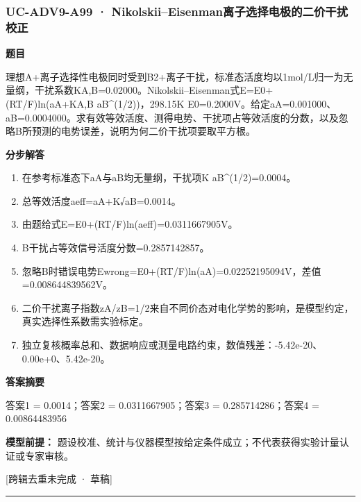 \documentclass[UTF8,11pt,a4paper]{ctexart}
\begin{document}
\subsubsection*{UC-ADV9-A99 · Nikolskii–Eisenman离子选择电极的二价干扰校正}
\noindent\textbf{题目}\par
理想A+离子选择性电极同时受到B2+离子干扰，标准态活度均以1mol/L归一为无量纲，干扰系数KA,B=0.02000。Nikolskii–Eisenman式E=E0+(RT/F)ln(aA+KA,B aB\textasciicircum{}(1/2))，298.15K E0=0.2000V。给定aA=0.001000、aB=0.0004000。求有效等效活度、测得电势、干扰项占等效活度的分数，以及忽略B所预测的电势误差，说明为何二价干扰项要取平方根。\par
\medskip\noindent\textbf{分步解答}
\begin{enumerate}
\item 在参考标准态下aA与aB均无量纲，干扰项K aB\textasciicircum{}(1/2)=0.0004。
\item 总等效活度aeff=aA+K√aB=0.0014。
\item 由题给式E=E0+(RT/F)ln(aeff)=0.0311667905V。
\item B干扰占等效信号活度分数=0.2857142857。
\item 忽略B时错误电势Ewrong=E0+(RT/F)ln(aA)=0.02252195094V，差值=0.008644839562V。
\item 二价干扰离子指数zA/zB=1/2来自不同价态对电化学势的影响，是模型约定，真实选择性系数需实验标定。
\item 独立复核概率总和、数据响应或测量电路约束，数值残差：-5.42e-20、0.00e+0、5.42e-20。
\end{enumerate}
\noindent\textbf{答案摘要}\par
答案1 = 0.0014；答案2 = 0.0311667905；答案3 = 0.285714286；答案4 = 0.00864483956\par
\noindent\textbf{模型前提：}
题设校准、统计与仪器模型按给定条件成立；不代表获得实验计量认证或专家审核。\par
\noindent\textcolor{red!65!black}{[跨辑去重未完成 · 草稿]} \par
\medskip\hrule\medskip
{}
\end{document}
